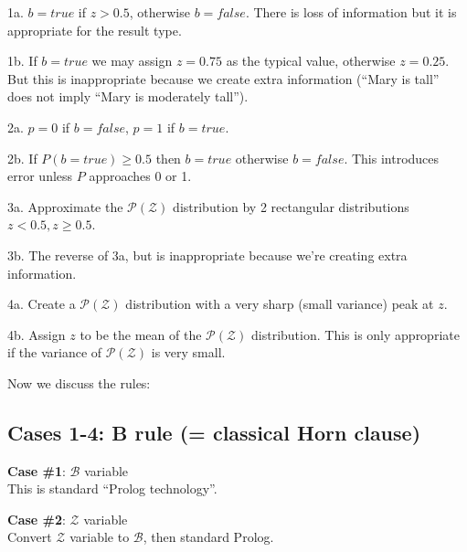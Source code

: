 1a. $b = true$ if $z > 0.5$, otherwise $b = false$. There is loss of information but it is appropriate for the result type.

1b. If $b = true$ we may assign $z = 0.75$ as the typical value, otherwise $z = 0.25$.  But this is inappropriate because we create extra information (``Mary is tall'' does not imply ``Mary is moderately tall'').

2a. $p = 0$ if $b = false$, $p = 1$ if $b = true$.

2b. If $P(b = true) \geq 0.5$ then $b = true$ otherwise $b = false$.  This introduces error unless $P$ approaches 0 or 1.

3a. Approximate the $\mathcal{P}(\mathcal{Z})$ distribution by 2 rectangular distributions $z < 0.5, z \geq 0.5$.

3b. The reverse of 3a, but is inappropriate because we're creating extra information.

4a. Create a $\mathcal{P}(\mathcal{Z})$ distribution with a very sharp (small variance) peak at $z$.

4b. Assign $z$ to be the mean of the $\mathcal{P}(\mathcal{Z})$ distribution.  This is only appropriate if the variance of $\mathcal{P}(\mathcal{Z})$ is very small.

Now we discuss the rules:

\subsection{Cases 1-4: B rule (= classical Horn clause)}


\textbf{Case \#1}: $\mathcal{B}$ variable\\
This is standard ``Prolog technology''.

\textbf{Case \#2}: $\mathcal{Z}$ variable\\
Convert $\mathcal{Z}$ variable to $\mathcal{B}$, then standard Prolog.



